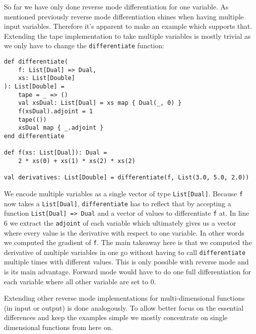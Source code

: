 So far we have only done reverse mode differentiation for one variable. As mentioned previously reverse mode differentiation shines when having multiple input variables. Therefore it's apparent to make an example which supports that. Extending the tape implementation to take multiple variables is mostly trivial as we only have to change the \lstinline{differentiate} function:
\begin{lstlisting}
def differentiate(
    f: List[Dual] => Dual, 
    xs: List[Double]
): List[Double] =
    tape = _ => ()
    val xsDual: List[Dual] = xs map { Dual(_, 0) }
    f(xsDual).adjoint = 1
    tape(())
    xsDual map { _.adjoint }
end differentiate

def f(xs: List[Dual]): Dual =
    2 * xs(0) + xs(1) * xs(2) * xs(2)

val derivatives: List[Double] = differentiate(f, List(3.0, 5.0, 2.0))
\end{lstlisting}
We encode multiple variables as a single vector of type \lstinline{List[Dual]}. Because \lstinline{f} now takes a \lstinline{List[Dual]}, \lstinline{differentiate} has to reflect that by accepting a function \lstinline{List[Dual] => Dual} and a vector of values to differentiate \lstinline{f} at. In line 6 we extract the \lstinline{adjoint} of each variable which ultimately gives us a vector where every value is the derivative with respect to one variable. In other words we computed the gradient of \lstinline{f}. The main takeaway here is that we computed the derivative of multiple variables in one go without having to call \lstinline{differentiate} multiple times with different values. This is only possible with reverse mode and is its main advantage. Forward mode would have to do one full differentiation for each variable where all other variable are set to 0.

Extending other reverse mode implementations for multi-dimensional functions (in input or output) is done analogously. To allow better focus on the essential differences and keep the examples simple we mostly concentrate on single dimensional functions from here on.